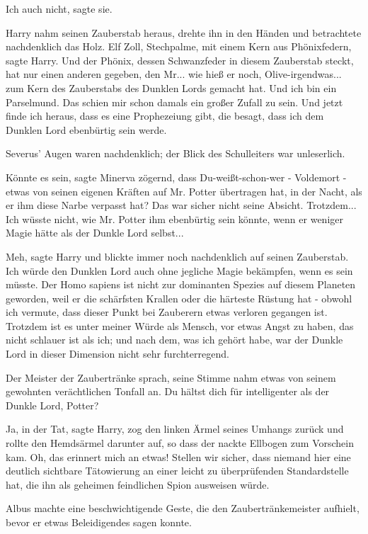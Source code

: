 \glqq{}Ich auch nicht\grqq{}, sagte sie.

Harry nahm seinen Zauberstab heraus, drehte ihn in den Händen und betrachtete
nachdenklich das Holz. \glqq{}Elf Zoll, Stechpalme, mit einem Kern aus
Phönixfedern\grqq{}, sagte Harry. \glqq{}Und der Phönix, dessen Schwanzfeder in
diesem Zauberstab steckt, hat nur einen anderen gegeben, den Mr... wie hieß er
noch, Olive-irgendwas... zum Kern des Zauberstabs des Dunklen Lords gemacht hat.
Und ich bin ein Parselmund. Das schien mir schon damals ein großer Zufall zu
sein. Und jetzt finde ich heraus, dass es eine Prophezeiung gibt, die besagt,
dass ich dem Dunklen Lord ebenbürtig sein werde.\grqq{}

Severus' Augen waren nachdenklich; der Blick des Schulleiters war unleserlich.

\glqq{}Könnte es sein\grqq{}, sagte Minerva zögernd, \glqq{}dass
Du-weißt-schon-wer - Voldemort - etwas von seinen eigenen Kräften auf Mr. Potter
übertragen hat, in der Nacht, als er ihm diese Narbe verpasst hat? Das war
sicher nicht seine Absicht. Trotzdem... Ich wüsste nicht, wie Mr. Potter ihm
ebenbürtig sein könnte, wenn er weniger Magie hätte als der Dunkle Lord
selbst...\grqq{}

\glqq{}Meh\grqq{}, sagte Harry und blickte immer noch nachdenklich auf seinen
Zauberstab. \glqq{}Ich würde den Dunklen Lord auch ohne jegliche Magie bekämpfen,
wenn es sein müsste. Der Homo sapiens ist nicht zur dominanten Spezies auf
diesem Planeten geworden, weil er die schärfsten Krallen oder die härteste
Rüstung hat - obwohl ich vermute, dass dieser Punkt bei Zauberern etwas verloren
gegangen ist. Trotzdem ist es unter meiner Würde als Mensch, vor etwas Angst zu
haben, das nicht schlauer ist als ich; und nach dem, was ich gehört habe, war
der Dunkle Lord in dieser Dimension nicht sehr furchterregend.\grqq{}

Der Meister der Zaubertränke sprach, seine Stimme nahm etwas von seinem
gewohnten verächtlichen Tonfall an. \glqq{}Du hältst dich für intelligenter als
der Dunkle Lord, Potter?\grqq{}

\glqq{}Ja, in der Tat\grqq{}, sagte Harry, zog den linken Ärmel seines Umhangs
zurück und rollte den Hemdsärmel darunter auf, so dass der nackte Ellbogen zum
Vorschein kam. \glqq{}Oh, das erinnert mich an etwas! Stellen wir sicher, dass
niemand hier eine deutlich sichtbare Tätowierung an einer leicht zu
überprüfenden Standardstelle hat, die ihn als geheimen feindlichen Spion
ausweisen würde.\grqq{}

Albus machte eine beschwichtigende Geste, die den Zaubertränkemeister aufhielt,
bevor er etwas Beleidigendes sagen konnte.

